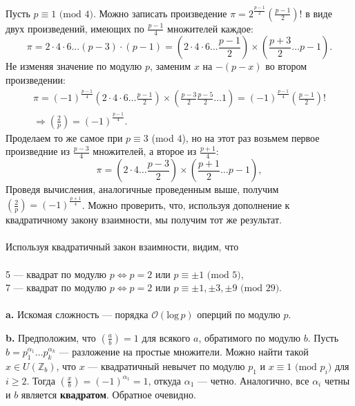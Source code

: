 \documentclass{mai_book}
\begin{document}
Пусть $p \equiv 1 \text{ (mod } 4)$. Можно записать произведение $\pi = 2^{\frac{p-1}{2}} (\frac{p-1}{2})!$ в виде двух произведений, имеющих по $\frac{p-1}{4}$ множителей каждое:
\begin{equation*}
	\pi = 2 \cdot 4 \cdot 6 \ldots  (p-3) \cdot (p-1) = (2 \cdot 4 \cdot 6 \ldots  \frac{p-1}{2}) \times (\frac{p+3}{2}\ldots p-1).
\end{equation*}
Не изменяя значение по модулю $p$, заменим $x$ на $-(p-x)$ во втором произведении:
\begin{gather*}
	\pi = (-1)^{\frac{p-1}{4}}(2 \cdot 4 \cdot 6 \ldots  \frac{p-1}{2}) \times (\frac{p-3}{2} \frac{p-5}{2} \ldots  1) = (-1)^{\frac{p-1}{4}}(\frac{p-1}{2})! \\
	\Rightarrow (\frac{2}{p}) = (-1)^{\frac{p-1}{4}}. 
\end{gather*}
Проделаем то же самое при $p \equiv 3$ (mod $4$), но на этот раз возьмем первое произведние из $\frac{p-3}{4}$ множителей, а второе из $\frac{p+1}{4}$:
\begin{equation*}
	\pi = (2 \cdot 4  \ldots  \frac{p-3}{2}) \times (\frac{p+1}{2}\ldots p-1),
\end{equation*}
Проведя вычисления, аналогичные проведенным выше, получим $(\frac{2}{p}) = (-1)^{\frac{p+1}{4}}$. Можно проверить, что, используя дополнение к квадратичному закону взаимности, мы получим тот же результат. \\

 \\

Используя квадратичный закон взаимности, видим, что \\


 \\
5 --- квадрат по модулю $p \Leftrightarrow p = 2$ или $p \equiv \pm 1 \text{ (mod } 5)$, \\
7 --- квадрат по модулю $p \Leftrightarrow p = 2$ или $p \equiv \pm 1, \pm 3, \pm 9 \text{ (mod } 29)$. \\

 \\

\textbf{a. } Искомая сложность --- порядка $\mathcal{O}(\text{log}\,p)$ оперций по модулю $p$.\smallskip

\textbf{b. } Предположим, что $(\frac{a}{b}) = 1$ для всякого $a$, обратимого по модулю $b$. Пусть $b = p_1^{{\alpha}_1}\ldots p_k^{{\alpha}_k}$ --- разложение на простые множители. Можно найти такой $x \in U(\mathbb{Z}_b)$, что $x$ --- квадратичный невычет по модулю $p_1$ и $x \equiv 1 \text{ (mod } p_i)$ для $i \ge 2$. Тогда $(\frac{x}{b}) = (-1)^{{\alpha}_1} = 1$, откуда ${\alpha}_1$ --- четно. Аналогично, все ${\alpha}_i$ четны и $b$ является \textbf{квадратом}. Обратное очевидно. \smallskip
\end{document}
